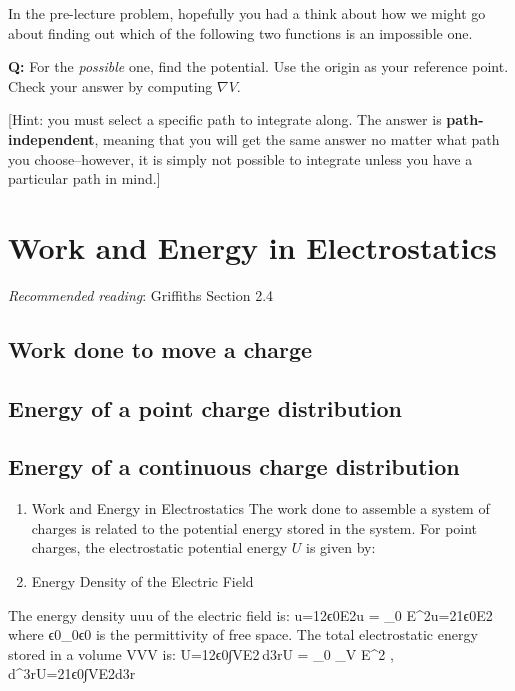 \documentclass[
  letterpaper,
  DIV=11,
  numbers=noendperiod]{scrreprt}
\begin{document}
In the pre-lecture problem, hopefully you had a think about how we might
go about finding out which of the following two functions is an
impossible one.

\textbf{Q:} For the \emph{possible} one, find the potential. Use the
origin as your reference point. Check your answer by computing
\(\nabla V\).

{[}Hint: you must select a specific path to integrate along. The answer
is \textbf{path-independent}, meaning that you will get the same answer
no matter what path you choose--however, it is simply not possible to
integrate unless you have a particular path in mind.{]}


\chapter{Work and Energy in
Electrostatics}\label{work-and-energy-in-electrostatics}

\emph{Recommended reading}: Griffiths Section 2.4

\section{Work done to move a charge}\label{work-done-to-move-a-charge}

\section{Energy of a point charge
distribution}\label{energy-of-a-point-charge-distribution}

\section{Energy of a continuous charge
distribution}\label{energy-of-a-continuous-charge-distribution}

\begin{enumerate}
\def\labelenumi{\arabic{enumi}.}
\setcounter{enumi}{9}
\item
  Work and Energy in Electrostatics The work done to assemble a system
  of charges is related to the potential energy stored in the system.
  For point charges, the electrostatic potential energy \(U\) is given
  by:
\item
  Energy Density of the Electric Field
\end{enumerate}

The energy density uuu of the electric field is: u=12ϵ0E2u = 
\epsilon\_0 E\^{}2u=21ϵ0E2 where ϵ0\epsilon\_0ϵ0 is the permittivity of
free space. The total electrostatic energy stored in a volume VVV is:
U=12ϵ0∫VE2 d3rU =  \epsilon\_0 \int\_V E\^{}2 ,
d\^{}3rU=21ϵ0∫VE2d3r
\end{document}
